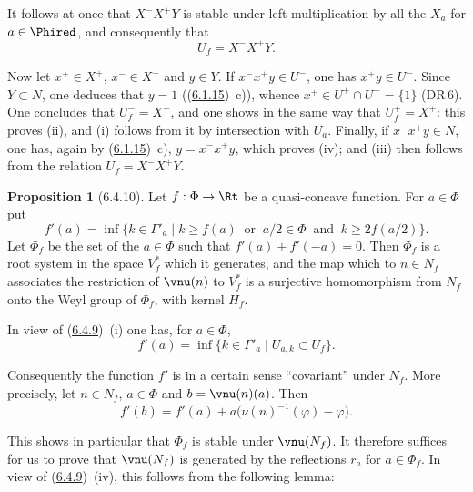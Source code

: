 \documentclass[12pt,a4paper,oneside,english]{smfart}
\makeatletter
\newcommand{\btanchor}[1]{\leavevmode\Hy@raisedlink{\hypertarget{bt:#1}{}}}
\newcommand{\btpageanchor}[1]{\Hy@raisedlink{\hypertarget{p:#1}{}}}
\newcommand{\btref}[1]{\hyperlink{bt:#1}{#1}}
\newcommand{\btpage}[1]{\marginnote{p.~#1}\btpageanchor{#1}}
\newcommand{\pmark}[1]{\btpage{#1}}
\theoremstyle{definition}
\theoremstyle{bt}
\newtheorem{prop}{Proposition}
\makeatother
\begin{document}
It follows at once that $X^{-}X^{+}Y$ is stable under left multiplication
by all the $X_a$ for $a\in\Phired$, and consequently that
\[
  U_f=X^{-}X^{+}Y.
\]

Now let $x^{+}\in X^{+}$, $x^{-}\in X^{-}$ and $y\in Y$. If
$x^{-}x^{+}y\in U^{-}$, one has $x^{+}y\in U^{-}$. Since $Y\subset N$, one
deduces that $y=1$ ((\btref{6.1.15})~c)), whence
$x^{+}\in U^{+}\cap U^{-}=\{1\}$ (DR\,6). One
\pmark{137}
concludes that $U_f^{-}=X^{-}$, and one shows in the same way that
$U_f^{+}=X^{+}$: this proves (ii), and (i) follows from it by intersection
with $U_a$. Finally, if $x^{-}x^{+}y\in N$, one has, again by (\btref{6.1.15})~c),
$y=x^{-}x^{+}y$, which proves (iv); and (iii) then follows from the
relation $U_f=X^{-}X^{+}Y$.

\begin{prop}[6.4.10]\btanchor{6.4.10}
Let $f:\Phi\to\Rt$ be a quasi-concave function. For $a\in\Phi$ put
\[
  f'(a)=\inf\{k\in\Gamma'_a\mid k\geq f(a)\ \text{ or }\    a/2\in\Phi\ \text{ and }\ k\geq2f(a/2)\}.
\]
Let $\Phi_f$ be the set of the $a\in\Phi$ such that $f'(a)+f'(-a)=0$. Then
$\Phi_f$ is a root system in the space $V^{*}_f$ which it generates, and the
map which to $n\in N_f$ associates the restriction of $\vnu(n)$ to
$V^{*}_f$ is a surjective homomorphism from $N_f$ onto the Weyl group of
$\Phi_f$, with kernel $H_f$.
\end{prop}

In view of (\btref{6.4.9})~(i) one has, for $a\in\Phi$,
\[
  f'(a)=\inf\{k\in\Gamma'_a\mid U_{a,k}\subset U_f\}.
\]

Consequently the function $f'$ is in a certain sense ``covariant'' under
$N_f$. More precisely, let $n\in N_f$, $a\in\Phi$ and $b=\vnu(n)(a)$. Then
\begin{equation}
  f'(b)=f'(a)+a\big(\nu(n)^{-1}(\varphi)-\varphi\big).
\end{equation}

This shows in particular that $\Phi_f$ is stable under $\vnu(N_f)$. It
therefore suffices for us to prove that $\vnu(N_f)$ is generated by the
reflections $r_a$ for $a\in\Phi_f$. In view of (\btref{6.4.9})~(iv), this follows
from the following lemma:
\end{document}

